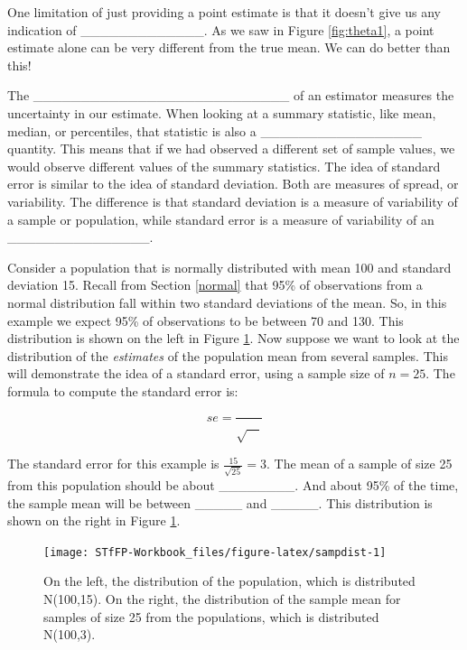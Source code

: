 \documentclass[]{book}
\theoremstyle{definition}
\theoremstyle{definition}
\theoremstyle{remark}
\begin{document}
One limitation of just providing a point estimate is that it doesn't
give us any indication of \_\_\_\_\_\_\_\_\_\_\_\_\_. As we saw in
Figure \ref{fig:theta1}, a point estimate alone can be very different
from the true mean. We can do better than this!

The \_\_\_\_\_\_\_\_\_\_\_\_\_\_\_\_\_\_\_\_\_\_\_\_\_\_\_ of an
estimator measures the uncertainty in our estimate. When looking at a
summary statistic, like mean, median, or percentiles, that statistic is
also a \_\_\_\_\_\_\_\_\_\_\_\_\_\_\_\_\_ quantity. This means that if
we had observed a different set of sample values, we would observe
different values of the summary statistics. The idea of standard error
is similar to the idea of standard deviation. Both are measures of
spread, or variability. The difference is that standard deviation is a
measure of variability of a sample or population, while standard error
is a measure of variability of an \_\_\_\_\_\_\_\_\_\_\_\_\_\_\_.

Consider a population that is normally distributed with mean 100 and
standard deviation 15. Recall from Section \ref{normal} that 95\% of
observations from a normal distribution fall within two standard
deviations of the mean. So, in this example we expect 95\% of
observations to be between 70 and 130. This distribution is shown on the
left in Figure \ref{fig:sampdist}. Now suppose we want to look at the
distribution of the \emph{estimates} of the population mean from several
samples. This will demonstrate the idea of a standard error, using a
sample size of \(n=25\). The formula to compute the standard error is:

\[se = \frac{}{\sqrt{\quad}}\]

The standard error for this example is \(\frac{15}{\sqrt{25}} = 3\). The
mean of a sample of size 25 from this population should be about
\_\_\_\_\_\_\_\_. And about 95\% of the time, the sample mean will be
between \_\_\_\_\_ and \_\_\_\_\_. This distribution is shown on the
right in Figure \ref{fig:sampdist}.

\begin{figure}[h]

{\centering \texttt{[image: STfFP-Workbook\_files/figure-latex/sampdist-1]} 

}

\caption{On the left, the distribution of the population, which is distributed N(100,15). On the right, the distribution of the sample mean for samples of size 25 from the populations, which is distributed N(100,3).}\label{fig:sampdist}
\end{figure}
\end{document}
